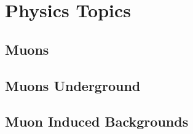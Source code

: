 \chapter{Physics Topics}
\label{chpt:PhysTop}
\section{Muons}
\section{Muons Underground}
\section{Muon Induced Backgrounds}